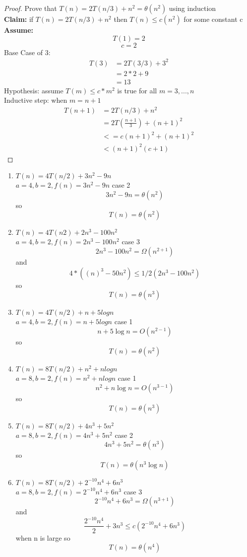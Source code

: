 \documentclass[11pt]{article}
\begin{document}
	\renewcommand{\headrulewidth}{0.4pt}
	\setlength{\headheight}{38.0pt}


	\begin{proof} Prove that $T(n) = 2T(n/3) +n^2 = \theta(n^2)$ using induction\\
	 	{\bf Claim:} if $T(n) = 2T(n/3) +n^2$ then $T(n) \leq c(n^2)$ for some constant c\\
	 	{\bf Assume:}	
	 	$$T(1) = 2$$
	 	$$c = 2$$
		Base Case of 3:	
		 	\begin{align*}
		 		T(3) &= 2T(3/3) + 3^2\\
		 		&=2 * 2 + 9\\
		 		&= 13
		 	\end{align*}
		Hypothesis: assume $T(m) \leq c*m^2$ is true for all $m = 3,...,n$\\
		Inductive step: when $m = n + 1$
		\begin{align*}
			T(n+1) &= 2T(n/3) + n^2\\
			&=2T(\frac{n+1}{3}) + (n+1)^2\\
			&<= c (n+1)^2 + (n+1)^2\\
			&< (n+1)^2(c+1)
		\end{align*}
	\end{proof}
	\newpage
	\begin{enumerate}
		\item $T(n) = 4T(n/2) + 3n^2 - 9n$\\
			$a = 4, b =2, f(n) = 3n^2 -9n$
			case 2
			$$3n^2 - 9n = \theta(n^2)$$
			so
			$$T(n) = \theta(n^2)$$
		\item $T(n) = 4T(n2) + 2n^3 - 100 n^2$\\
			$a = 4, b =2,f(n) = 2n^3 - 100 n^2$	case 3
			$$2n^3 - 100n^2 = \Omega(n^{2+1})$$
			and
			$$4 * ((n) ^ 3 - 50n^2) \leq 1/2 (2n^3 - 100 n^2) $$
			so
			$$T(n) = \theta(n^3)$$
		\item $T(n) = 4T(n/2) + n + 5 log n$\\
			$a = 4 , b= 2, f(n) = n + 5 log n$ case 1
			$$n + 5 \log n = O(n^{2 -1})$$
			so
			$$T(n) = \theta(n^2)$$
		\item $T(n) = 8T(n/2) + n^2 + n log n$\\
			$a = 8 , b= 2, f(n) = n^2 + n log n$ case 1
			$$n^2 + n \log n = O(n^{3 -1})$$
			so
			$$T(n) = \theta(n^3)$$
		\item $T(n) = 8T(n/2) + 4n^3 + 5n^2$\\
			$a = 8 , b= 2, f(n) = 4n^3 + 5n^2$ case 2
			$$4n^3 + 5n^2 = \theta(n^{3})$$
			so
			$$T(n) = \theta(n^3\log n)$$
			
		\item $T(n) = 8T(n/2) + 2^{-10} n^4 + 6n^3$\\
			$a = 8 , b= 2, f(n) = 2^{-10} n^4 + 6n^3$	case 3
			$$ 2^{-10} n^4 + 6n^3 = \Omega(n^{3+1})$$
			and
			$$ \frac{2^{-10} n^4}{2} + 3n^3 \leq c (2^{-10} n^4 + 6n^3)$$
			when n is large
			so
			$$T(n) = \theta(n^4)$$	
	\end{enumerate}
\end{document}
